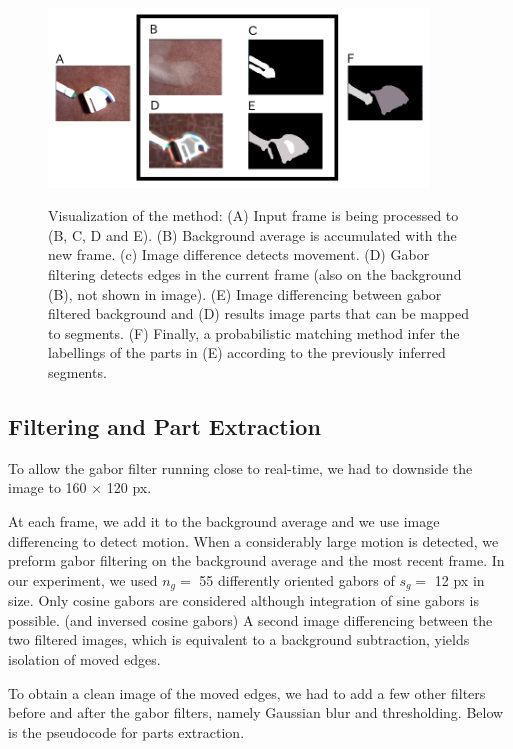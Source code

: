 \documentclass{article}
\begin{document}
\begin{figure}[tbp]
\begin{center}
\caption{Visualization of the method: (A) Input frame is being processed to (B, C, D and E). (B) Background average is accumulated with the new frame. (c) Image difference detects movement. (D) Gabor filtering detects edges in the current frame (also on the background (B), not shown in image). (E) Image differencing between gabor filtered background and (D) results image parts that can be mapped to segments. (F) Finally, a probabilistic matching method infer the labellings of the parts in (E) according to the previously inferred segments.}
  \includegraphics[width=0.9\textwidth]{1}
\label{figure:model_seq}
\end{center}
\end{figure}

\subsection{Filtering and Part Extraction}

To allow the gabor filter running close to real-time, we had to downside the image to 160 $\times$ 120 px. 

At each frame, we add it to the background average and we use image differencing to detect motion. When a considerably large motion is detected, we preform gabor filtering on the background average and the most recent frame. In our experiment, we used $n_g=$ 55 differently oriented gabors of $s_g=$ 12 px in size. Only cosine gabors are considered although integration of sine gabors is possible. (and inversed cosine gabors) A second image differencing between the two filtered images, which is equivalent to a background subtraction, yields isolation of moved edges. 

To obtain a clean image of the moved edges, we had to add a few other filters before and after the gabor filters, namely Gaussian blur and thresholding. Below is the pseudocode for parts extraction.\\
\end{document}
